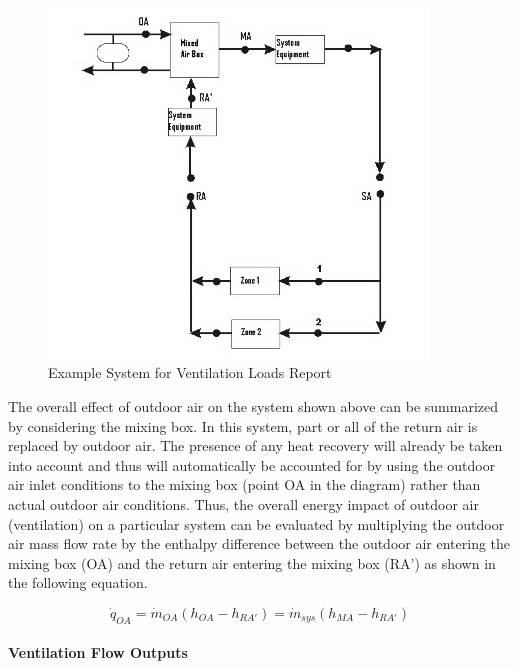 \begin{figure}[hbtp] %
\centering
\includegraphics[width=0.9\textwidth, height=0.9\textheight, keepaspectratio=true]{media/image209.png}
\caption{Example System for Ventilation Loads Report \protect \label{fig:example-system-for-ventilation-loads-report}}
\end{figure}

The overall effect of outdoor air on the system shown above can be summarized by considering the mixing box. In this system, part or all of the return air is replaced by outdoor air. The presence of any heat recovery will already be taken into account and thus will automatically be accounted for by using the outdoor air inlet conditions to the mixing box (point OA in the diagram) rather than actual outdoor air conditions. Thus, the overall energy impact of outdoor air (ventilation) on a particular system can be evaluated by multiplying the outdoor air mass flow rate by the enthalpy difference between the outdoor air entering the mixing box (OA) and the return air entering the mixing box (RA') as shown in the following equation.

\begin{equation}
{\dot q_{OA}} = {\dot m_{OA}}\left( {{h_{OA}} - {h_{RA'}}} \right) = {\dot m_{sys}}\left( {{h_{MA}} - {h_{RA'}}} \right)
\end{equation}

\paragraph{Ventilation Flow Outputs}\label{ventilation-flow-outputs}

